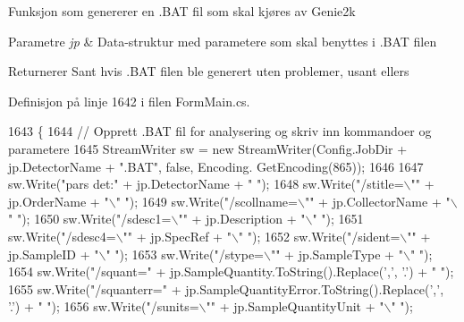 Funksjon som genererer en .B\+A\+T fil som skal kjøres av Genie2k


\begin{DoxyParams}{Parametre}
{\em jp} & Data-\/struktur med parametere som skal benyttes i .B\+A\+T filen\\
\hline
\end{DoxyParams}
\begin{DoxyReturn}{Returnerer}
Sant hvis .B\+A\+T filen ble generert uten problemer, usant ellers 
\end{DoxyReturn}


Definisjon på linje 1642 i filen Form\+Main.\+cs.


\begin{DoxyCode}
1643         \{
1644             \textcolor{comment}{// Opprett .BAT fil for analysering og skriv inn kommandoer og parametere}
1645             StreamWriter sw = \textcolor{keyword}{new} StreamWriter(Config.JobDir + jp.DetectorName + \textcolor{stringliteral}{".BAT"}, \textcolor{keyword}{false}, Encoding.
      GetEncoding(865));
1646             
1647             sw.Write(\textcolor{stringliteral}{"pars det:"} + jp.DetectorName + \textcolor{stringliteral}{" "});
1648             sw.Write(\textcolor{stringliteral}{"/stitle=\(\backslash\)""} + jp.OrderName + \textcolor{stringliteral}{"\(\backslash\)" "});
1649             sw.Write(\textcolor{stringliteral}{"/scollname=\(\backslash\)""} + jp.CollectorName + \textcolor{stringliteral}{"\(\backslash\)" "});
1650             sw.Write(\textcolor{stringliteral}{"/sdesc1=\(\backslash\)""} + jp.Description + \textcolor{stringliteral}{"\(\backslash\)" "});
1651             sw.Write(\textcolor{stringliteral}{"/sdesc4=\(\backslash\)""} + jp.SpecRef + \textcolor{stringliteral}{"\(\backslash\)" "});
1652             sw.Write(\textcolor{stringliteral}{"/sident=\(\backslash\)""} + jp.SampleID + \textcolor{stringliteral}{"\(\backslash\)" "});
1653             sw.Write(\textcolor{stringliteral}{"/stype=\(\backslash\)""} + jp.SampleType + \textcolor{stringliteral}{"\(\backslash\)" "});
1654             sw.Write(\textcolor{stringliteral}{"/squant="} + jp.SampleQuantity.ToString().Replace(\textcolor{charliteral}{','}, \textcolor{charliteral}{'.'}) + \textcolor{stringliteral}{" "});
1655             sw.Write(\textcolor{stringliteral}{"/squanterr="} + jp.SampleQuantityError.ToString().Replace(\textcolor{charliteral}{','}, \textcolor{charliteral}{'.'}) + \textcolor{stringliteral}{" "});
1656             sw.Write(\textcolor{stringliteral}{"/sunits=\(\backslash\)""} + jp.SampleQuantityUnit + \textcolor{stringliteral}{"\(\backslash\)" "});

\end{DoxyCode}
